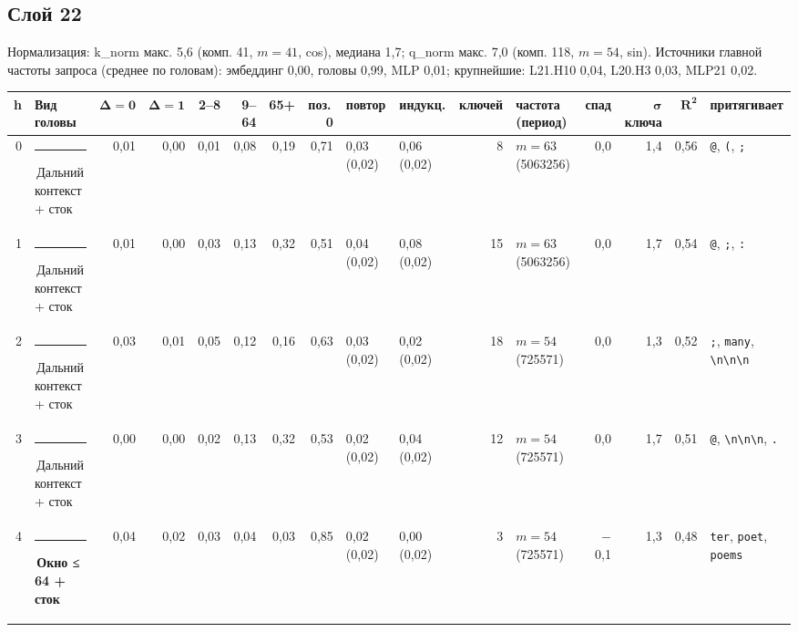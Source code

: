 \documentclass[10pt]{article}
\begin{document}
\noindent\begin{minipage}{\linewidth}
\subsection*{Слой 22}
{\small\color{ink2} Нормализация: k\_norm макс. 5,6 (комп. 41, $m{=}41$, cos), медиана 1,7; q\_norm макс. 7,0 (комп. 118, $m{=}54$, sin). Источники главной частоты запроса (среднее по головам): эмбеддинг 0,00, головы 0,99, MLP 0,01; крупнейшие: L21.H10 0,04, L20.H3 0,03, MLP21 0,02.}
\begin{center}{\footnotesize\begin{tabular}{|r|l|r|r|r|r|r|r|l|l|r|l|r|r|r|l|}
\hline
\rowcolor{head}\textbf{h} & \textbf{Вид головы} & $\boldsymbol{\Delta{=}0}$ & $\boldsymbol{\Delta{=}1}$ & \textbf{2–8} & \textbf{9–64} & \textbf{65+} & \textbf{поз.\,0} & \textbf{повтор} & \textbf{индукц.} & \textbf{ключей} & \textbf{частота (период)} & \textbf{спад} & $\boldsymbol{\sigma}$ \textbf{ключа} & $\boldsymbol{R^2}$ & \textbf{притягивает} \\ \hline
0 & \textcolor[HTML]{C3C2B7}{\rule{0.62em}{0.62em}}\,Дальний контекст + сток & 0,01 & 0,00 & 0,01 & 0,08 & 0,19 & 0,71 & 0,03 (0,02) & 0,06 (0,02) & 8 & $m{=}63$ (5063256) & 0,0 & 1,4 & 0,56 & \texttt{\textvisiblespace{}@}, \texttt{\textvisiblespace{}(}, \texttt{\textvisiblespace{};} \\ \hline
1 & \textcolor[HTML]{C3C2B7}{\rule{0.62em}{0.62em}}\,Дальний контекст + сток & 0,01 & 0,00 & 0,03 & 0,13 & 0,32 & 0,51 & 0,04 (0,02) & 0,08 (0,02) & 15 & $m{=}63$ (5063256) & 0,0 & 1,7 & 0,54 & \texttt{\textvisiblespace{}@}, \texttt{\textvisiblespace{};}, \texttt{\textvisiblespace{}:} \\ \hline
2 & \textcolor[HTML]{C3C2B7}{\rule{0.62em}{0.62em}}\,Дальний контекст + сток & 0,03 & 0,01 & 0,05 & 0,12 & 0,16 & 0,63 & 0,03 (0,02) & 0,02 (0,02) & 18 & $m{=}54$ (725571) & 0,0 & 1,3 & 0,52 & \texttt{\textvisiblespace{};}, \texttt{\textvisiblespace{}many}, \texttt{\textvisiblespace{}\textbackslash{}n\textbackslash{}n\textbackslash{}n} \\ \hline
3 & \textcolor[HTML]{C3C2B7}{\rule{0.62em}{0.62em}}\,Дальний контекст + сток & 0,00 & 0,00 & 0,02 & 0,13 & 0,32 & 0,53 & 0,02 (0,02) & 0,04 (0,02) & 12 & $m{=}54$ (725571) & 0,0 & 1,7 & 0,51 & \texttt{\textvisiblespace{}@}, \texttt{\textvisiblespace{}\textbackslash{}n\textbackslash{}n\textbackslash{}n}, \texttt{\textvisiblespace{}.} \\ \hline
4 & \textcolor[HTML]{EDA100}{\rule{0.62em}{0.62em}}\,\textbf{Окно ≤ 64 + сток} & 0,04 & 0,02 & 0,03 & 0,04 & 0,03 & 0,85 & 0,02 (0,02) & 0,00 (0,02) & 3 & $m{=}54$ (725571) & $-$0,1 & 1,3 & 0,48 & \texttt{ter}, \texttt{\textvisiblespace{}poet}, \texttt{\textvisiblespace{}poems} \\ \hline

\end{tabular}}
\end{center}
\end{minipage}
\end{document}
